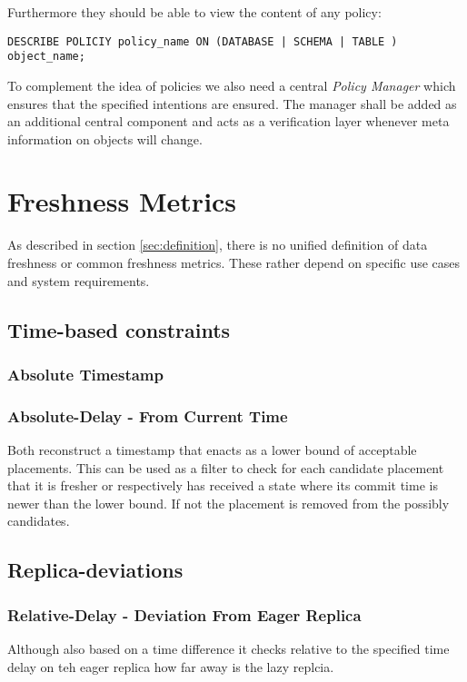 Furthermore they should be able to view the content of any policy: 
\begin{verbatim}
DESCRIBE POLICIY policy_name ON (DATABASE | SCHEMA | TABLE ) object_name; 
\end{verbatim}

To complement the idea of policies we also need a central \emph{Policy Manager} which ensures that the specified intentions are ensured.
The manager shall be added as an additional central component and acts as a verification layer whenever meta information on objects will change.



\section{Freshness Metrics}
As described in section \ref{sec:definition}, there is no unified definition of data freshness or common freshness metrics.
These rather depend on specific use cases and system requirements.
\subsection{Time-based constraints}
\subsubsection{Absolute Timestamp}
\subsubsection{Absolute-Delay - From Current Time}
Both reconstruct a timestamp that enacts as a lower bound of acceptable placements.
This can be used as a filter to check for each candidate placement that it is fresher or respectively has received a state where its commit time is newer 
than the lower bound. If not the placement is removed from the possibly candidates. 


\subsection{Replica-deviations}

\subsubsection{Relative-Delay - Deviation From Eager Replica}
Although also based on a time difference it checks relative to the specified time delay on teh eager  replica how far away is the lazy replcia.

